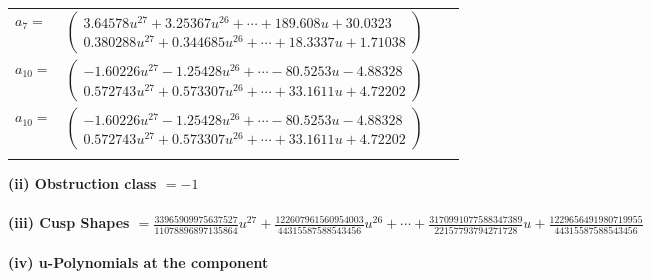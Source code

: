 \documentclass[1p]{elsarticle_modified}
\theoremstyle{definition}
\begin{document}
\begin{tabular}{m{7pt} m{180pt} m{7pt} m{180pt} }
\flushright $a_{7}=$&$\begin{pmatrix}3.64578 u^{27}+3.25367 u^{26}+\cdots+189.608 u+30.0323\\0.380288 u^{27}+0.344685 u^{26}+\cdots+18.3337 u+1.71038\end{pmatrix}$ \\
\flushright $a_{10}=$&$\begin{pmatrix}-1.60226 u^{27}-1.25428 u^{26}+\cdots-80.5253 u-4.88328\\0.572743 u^{27}+0.573307 u^{26}+\cdots+33.1611 u+4.72202\end{pmatrix}$\\ \flushright $a_{10}=$&$\begin{pmatrix}-1.60226 u^{27}-1.25428 u^{26}+\cdots-80.5253 u-4.88328\\0.572743 u^{27}+0.573307 u^{26}+\cdots+33.1611 u+4.72202\end{pmatrix}$\\&\end{tabular}
\flushleft \textbf{(ii) Obstruction class $= -1$}\\~\\
\flushleft \textbf{(iii) Cusp Shapes $= \frac{33965909975637527}{11078896897135864} u^{27}+\frac{122607961560954003}{44315587588543456} u^{26}+\cdots+\frac{3170991077588347389}{22157793794271728} u+\frac{1229656491980719955}{44315587588543456}$}\\~\\
\newpage\renewcommand{\arraystretch}{1}
\flushleft \textbf{(iv) u-Polynomials at the component}\newline \\
\end{document}
